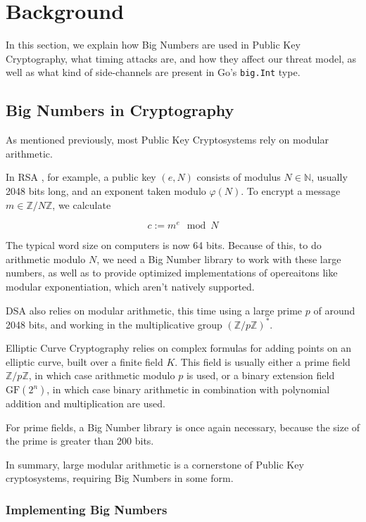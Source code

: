 \documentclass[11pt, a4paper]{article} %
\begin{document}
{\section{Background}

In this section, we explain how Big Numbers are used in Public Key
Cryptography, what timing attacks are, and how they affect our threat
model, as well as what kind of side-channels are present in Go's
\texttt{big.Int} type.

\subsection{Big Numbers in Cryptography}

As mentioned previously, most Public Key Cryptosystems rely on
modular arithmetic.

In RSA \cite{rivest_method_1978}, for example, a public key $(e, N)$ consists of modulus
$N \in \mathbb{N}$, usually 2048 bits long, and an exponent taken
modulo $\varphi(N)$.
To encrypt a message $m \in \mathbb{Z}/N\mathbb{Z}$, we calculate

$$
c := m^e \mod N
$$

The typical word size on computers is now 64 bits. Because of this,
to do arithmetic modulo $N$, we need a Big Number library to work
with these large numbers, as well as to provide optimized implementations
of opereaitons like modular exponentiation, which aren't natively supported.

DSA
\cite{technology_digital_1994} also relies on modular arithmetic,
this time using a large prime $p$ of around 2048 bits, and working
in the multiplicative group $(\mathbb{Z}/p\mathbb{Z})^*$.

Elliptic Curve Cryptography
\cite{miller_use_1986} relies on complex formulas for adding points
on an elliptic curve, built over a finite field $K$. This field
is usually either a prime field $\mathbb{Z}/p\mathbb{Z}$, in which case arithmetic
modulo $p$ is used, or a
binary extension field $\text{GF}(2^n)$, in which case
binary arithmetic in combination with polynomial addition and multiplication
are used.

For prime fields, a Big Number library is once again necessary, because
the size of the prime is greater than 200 bits.

In summary, large modular arithmetic is a cornerstone of Public Key
cryptosystems, requiring Big Numbers in some form.

\subsubsection{Implementing Big Numbers}

}
\end{document}
